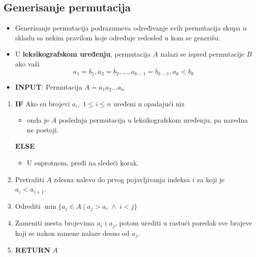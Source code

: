 \documentclass[a4paper,12pt]{article}
\numberwithin{algorithm}{section}
\theoremstyle{plain}
\theoremstyle{definition}
\theoremstyle{remark}
\begin{document}
\subsection{Generisanje permutacija}
\begin{itemize}
    \item Generisanje permutacija podrazumeva određivanje svih permutacija skupa u skladu sa nekim pravilom koje određuje redosled u kom se generišu.
    \item U \textbf{leksikografskom uređenju}, permutacija $A$ nalazi se ispred permutacije $B$ ako važi \[ a_1 = b_1, a_2 = b_2, \ldots, a_{k-1} = b_{k-1}, a_k < b_k \]
\end{itemize}
\vfill
\begin{algorithm}[!h]
    \caption{Naredna permutacija}
    \begin{itemize}
        \item \textbf{INPUT}: Permutacija $A = a_1a_2\dots a_n$
    \end{itemize}
    \begin{enumerate}
        \item \textbf{IF} Ako su brojevi $a_i, \;1 \leq i \leq n$ uređeni u opadajući niz
        \begin{itemize}
            \item onda je $A$ poslednja permutacija u leksikografskom uređenju, pa naredna ne postoji.
        \end{itemize} 
        \textbf{ELSE}
        \begin{itemize}
            \item U suprotnom, pređi na sledeći korak.
        \end{itemize}
        \item Pretražiti $A$ zdesna nalevo do prvog pojavljivanja indeksa $i$ za koji je $a_i < a_{i + 1}$.
        \item Odrediti $\min \{a_j \in A \;|\; a_j > a_i \;\land\; i < j\}$
        \item Zameniti mesta brojevima $a_i$ i $a_j$, potom urediti u rastući poredak sve brojeve koji se nakon zamene nalaze desno od $a_j$.
        \item \textbf{RETURN} $A$
    \end{enumerate}
\end{algorithm}
\vfill
\newpage
\end{document}
